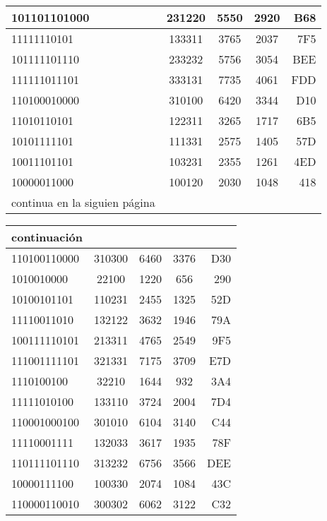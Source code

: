 \documentclass[12pt]{article}
\begin{document}
\begin{center}
\begin{tabular}{||l|c|c|c|r||}
101101101000 & 231220 & 5550 & 2920 & B68 \\ \hline
11111110101 & 133311 & 3765 & 2037 & 7F5 \\ \hline
101111101110 & 233232 & 5756 & 3054 & BEE \\ \hline
111111011101 & 333131 & 7735 & 4061 & FDD \\ \hline
110100010000 & 310100 & 6420 & 3344 & D10 \\ \hline
11010110101 & 122311 & 3265 & 1717 & 6B5 \\ \hline
10101111101 & 111331 & 2575 & 1405 & 57D \\ \hline
10011101101 & 103231 & 2355 & 1261 & 4ED \\ \hline
10000011000 & 100120 & 2030 & 1048 & 418 \\ \hline
continua en la siguien p\'agina \\ \hline

\end{tabular}
\end{center}

\begin{center}
\begin{tabular}{||l|c|c|c|r||}

continuaci\'on \\ \hline
110100110000 & 310300 & 6460 & 3376 & D30 \\ \hline
1010010000 & 22100 & 1220 & 656 & 290 \\ \hline
10100101101 & 110231 & 2455 & 1325 & 52D \\ \hline
11110011010 & 132122 & 3632 & 1946 & 79A \\ \hline
100111110101 & 213311 & 4765 & 2549 & 9F5 \\ \hline
111001111101 & 321331 & 7175 & 3709 & E7D \\ \hline
1110100100 & 32210 & 1644 & 932 & 3A4 \\ \hline
11111010100 & 133110 & 3724 & 2004 & 7D4 \\ \hline
110001000100 & 301010 & 6104 & 3140 & C44 \\ \hline
11110001111 & 132033 & 3617 & 1935 & 78F \\ \hline
110111101110 & 313232 & 6756 & 3566 & DEE \\ \hline
10000111100 & 100330 & 2074 & 1084 & 43C \\ \hline
110000110010 & 300302 & 6062 & 3122 & C32 \\ \hline

\end{tabular}
\end{center}
\end{document}
